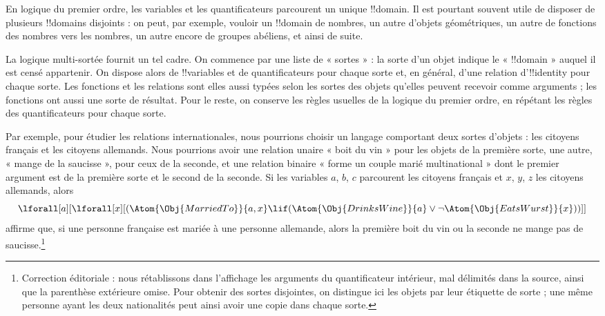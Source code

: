 \documentclass[../../../include/open-logic-section]{subfiles}
\begin{document}


En logique du premier ordre, les variables et les quantificateurs
parcourent un unique !!{domain}. Il est pourtant souvent utile de
disposer de plusieurs !!{domain}s disjoints : on peut, par exemple,
vouloir un !!{domain} de nombres, un autre d'objets géométriques,
un autre de fonctions des nombres vers les nombres, un autre encore
de groupes abéliens, et ainsi de suite.

La logique multi-sortée fournit un tel cadre. On commence par une liste
de « sortes » : la sorte d'un objet indique le « !!{domain} »
auquel il est censé appartenir. On dispose alors de !!{variable}s et
de quantificateurs pour chaque sorte et, en général, d'une relation
d'!!{identity} pour chaque sorte. Les fonctions et les relations
sont elles aussi typées selon les sortes des objets qu'elles peuvent
recevoir comme arguments ; les fonctions ont aussi une sorte de résultat. Pour le reste, on conserve les règles
usuelles de la logique du premier ordre, en répétant les règles des
quantificateurs pour chaque sorte.

Par exemple, pour étudier les relations internationales, nous
pourrions choisir un langage comportant deux sortes d'objets : les
citoyens français et les citoyens allemands. Nous pourrions avoir une
relation unaire « boit du vin » pour les objets de la première sorte,
une autre, « mange de la saucisse », pour ceux de la seconde, et une
relation binaire « forme un couple marié multinational » dont le
premier argument est de la première sorte et le second de la seconde.
Si les variables $a$, $b$, $c$ parcourent les citoyens français et
$x$, $y$, $z$ les citoyens allemands, alors
\[
\lforall[a][\lforall[x][(\Atom{\Obj{MarriedTo}}{a,x} \lif
(\Atom{\Obj{DrinksWine}}{a} \lor \lnot \Atom{\Obj{EatsWurst}}{x}))]]
\]
affirme que, si une personne française est mariée à une personne
allemande, alors la première boit du vin ou la seconde ne mange pas
de saucisse.\footnote{Correction éditoriale : nous rétablissons dans l'affichage les arguments du quantificateur intérieur, mal délimités dans la source, ainsi que la parenthèse extérieure omise. Pour obtenir des sortes disjointes, on distingue ici les objets par leur étiquette de sorte ; une même personne ayant les deux nationalités peut ainsi avoir une copie dans chaque sorte.}
\end{document}
